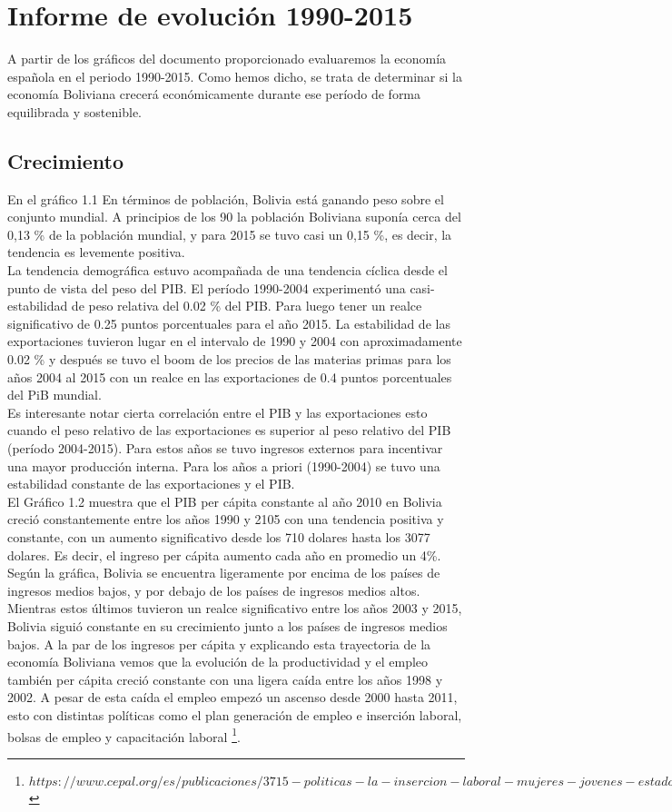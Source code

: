 \section{Informe de evolución 1990-2015}
A partir de los gráficos del documento proporcionado evaluaremos la economía española en el periodo 1990-2015. Como hemos dicho, se trata de determinar si la economía Boliviana crecerá económicamente durante ese período de forma equilibrada y sostenible.

    \subsection{Crecimiento}
    En el gráfico 1.1  En términos de población, Bolivia está ganando peso sobre el conjunto mundial. A principios de los 90 la población Boliviana suponía cerca del 0,13 \% de la población mundial, y para 2015 se tuvo casi un 0,15 \%, es decir, la tendencia es levemente positiva.\\
    La tendencia demográfica estuvo acompañada de una tendencia cíclica desde el punto de vista del peso del PIB. El período 1990-2004 experimentó una casi-estabilidad de peso relativa del 0.02 \% del PIB. Para luego tener un realce significativo de 0.25 puntos porcentuales para el año 2015. La estabilidad de las exportaciones tuvieron lugar en el intervalo de 1990 y 2004 con aproximadamente 0.02 \% y después se tuvo el boom de los precios de las materias primas para los años 2004 al 2015 con un realce en las exportaciones de 0.4 puntos porcentuales del PiB mundial.\\
    Es interesante notar cierta correlación entre el PIB y las exportaciones esto cuando el peso relativo de las exportaciones es superior al peso relativo del PIB (período 2004-2015). Para estos años se tuvo ingresos externos para incentivar una mayor producción interna.  Para los años a priori (1990-2004) se tuvo una estabilidad constante de las exportaciones y el PIB.\\

    El Gráfico 1.2 muestra que el PIB per cápita constante al año 2010 en Bolivia creció constantemente entre los años 1990 y 2105 con una tendencia positiva y constante, con un aumento significativo desde los 710 dolares hasta los 3077 dolares. Es decir, el ingreso per cápita aumento cada año en promedio un 4\%. \\
    Según la gráfica, Bolivia se encuentra ligeramente por encima de los países de ingresos medios bajos, y por debajo de los países de ingresos medios altos. Mientras estos últimos tuvieron un realce significativo entre los años 2003 y 2015, Bolivia siguió constante en su crecimiento junto a los países de ingresos medios bajos.
    A la par de los ingresos per cápita y explicando esta trayectoria de la economía Boliviana vemos que la evolución de la productividad y el empleo también per cápita creció constante con una ligera caída entre los años 1998 y 2002. A pesar de esta caída el empleo empezó un ascenso desde 2000 hasta 2011, esto con distintas políticas como el plan generación de empleo e inserción laboral, bolsas de empleo y capacitación laboral \footnote{$https://www.cepal.org/es/publicaciones/3715-politicas-la-insercion-laboral-mujeres-jovenes-estado-plurinacional-bolivia$}.

